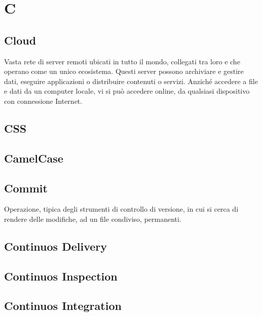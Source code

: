 \section*{C}

\subsection{Cloud}
Vasta rete di server remoti ubicati in tutto il mondo, collegati tra loro e che operano come un unico ecosistema. Questi server possono archiviare e gestire dati, eseguire applicazioni o distribuire contenuti o servizi. Anziché accedere a file e dati da un computer locale, vi si può accedere online, da qualsiasi dispositivo con connessione Internet.

\subsection{CSS}

\subsection{CamelCase}

\subsection{Commit}
Operazione, tipica degli strumenti di controllo di versione, in cui si cerca di rendere delle modifiche, ad un file condiviso, permanenti.

\subsection{Continuos Delivery}

\subsection{Continuos Inspection}

\subsection{Continuos Integration}

